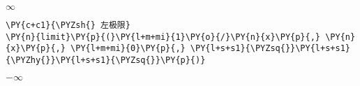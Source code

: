             
    
    $\displaystyle \infty$

    

    \begin{tcolorbox}[breakable, size=fbox, boxrule=1pt, pad at break*=1mm,colback=cellbackground, colframe=cellborder]
\begin{Verbatim}[commandchars=\\\{\}]
\PY{c+c1}{\PYZsh{} 左极限}
\PY{n}{limit}\PY{p}{(}\PY{l+m+mi}{1}\PY{o}{/}\PY{n}{x}\PY{p}{,} \PY{n}{x}\PY{p}{,} \PY{l+m+mi}{0}\PY{p}{,} \PY{l+s+s1}{\PYZsq{}}\PY{l+s+s1}{\PYZhy{}}\PY{l+s+s1}{\PYZsq{}}\PY{p}{)}
\end{Verbatim}
\end{tcolorbox}
 
            
    
    $\displaystyle -\infty$
